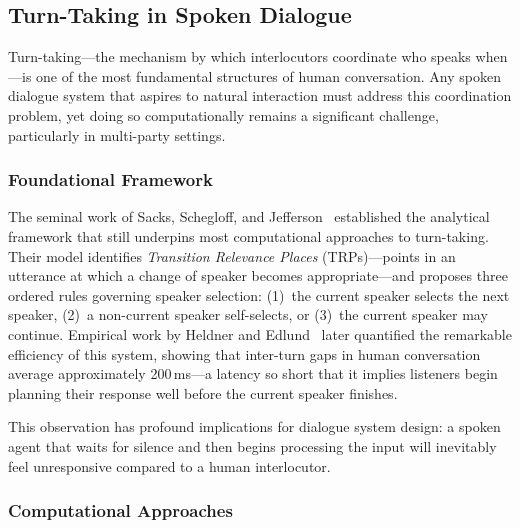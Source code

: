 
\subsection{Turn-Taking in Spoken Dialogue}
\label{sec:turntaking}

Turn-taking---the mechanism by which interlocutors coordinate who speaks when---is one of the most fundamental structures of human conversation. Any spoken dialogue system that aspires to natural interaction must address this coordination problem, yet doing so computationally remains a significant challenge, particularly in multi-party settings.

\subsubsection{Foundational Framework}

The seminal work of Sacks, Schegloff, and Jefferson~\cite{sacks1974turntaking} established the analytical framework that still underpins most computational approaches to turn-taking. Their model identifies \emph{Transition Relevance Places} (TRPs)---points in an utterance at which a change of speaker becomes appropriate---and proposes three ordered rules governing speaker selection: (1)~the current speaker selects the next speaker, (2)~a non-current speaker self-selects, or (3)~the current speaker may continue. Empirical work by Heldner and Edlund~\cite{heldner2010pauses} later quantified the remarkable efficiency of this system, showing that inter-turn gaps in human conversation average approximately 200\,ms---a latency so short that it implies listeners begin planning their response well before the current speaker finishes.

This observation has profound implications for dialogue system design: a spoken agent that waits for silence and then begins processing the input will inevitably feel unresponsive compared to a human interlocutor.

\subsubsection{Computational Approaches}

